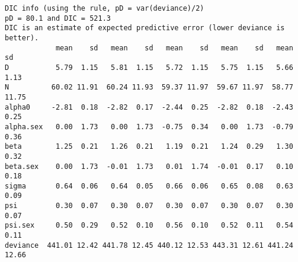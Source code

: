 \begin{verbatim}
DIC info (using the rule, pD = var(deviance)/2)
pD = 80.1 and DIC = 521.3
DIC is an estimate of expected predictive error (lower deviance is better).
            mean    sd   mean    sd   mean    sd   mean    sd   mean    sd
D           5.79  1.15   5.81  1.15   5.72  1.15   5.75  1.15   5.66  1.13
N          60.02 11.91  60.24 11.93  59.37 11.97  59.67 11.97  58.77 11.75
alpha0     -2.81  0.18  -2.82  0.17  -2.44  0.25  -2.82  0.18  -2.43  0.25
alpha.sex   0.00  1.73   0.00  1.73  -0.75  0.34   0.00  1.73  -0.79  0.36
beta        1.25  0.21   1.26  0.21   1.19  0.21   1.24  0.29   1.30  0.32
beta.sex    0.00  1.73  -0.01  1.73   0.01  1.74  -0.01  0.17   0.10  0.18
sigma       0.64  0.06   0.64  0.05   0.66  0.06   0.65  0.08   0.63  0.09
psi         0.30  0.07   0.30  0.07   0.30  0.07   0.30  0.07   0.30  0.07
psi.sex     0.50  0.29   0.52  0.10   0.56  0.10   0.52  0.11   0.54  0.11
deviance  441.01 12.42 441.78 12.45 440.12 12.53 443.31 12.61 441.24 12.66
\end{verbatim}



